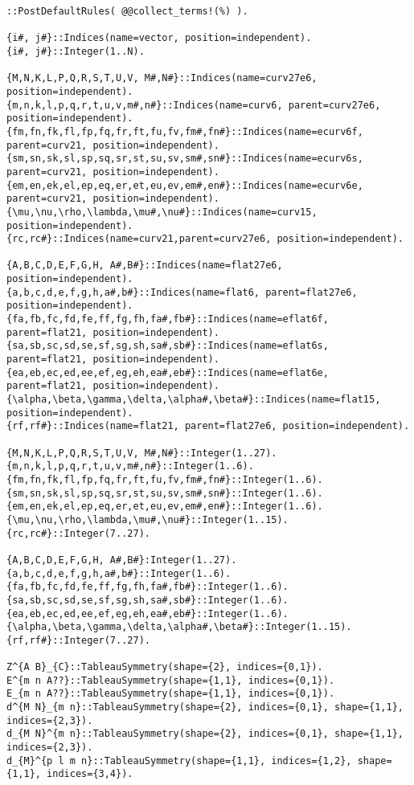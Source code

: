 \documentclass[11pt]{article}
\begin{document}
{\color[named]{Blue}\begin{verbatim}
::PostDefaultRules( @@collect_terms!(%) ).

{i#, j#}::Indices(name=vector, position=independent).
{i#, j#}::Integer(1..N).

{M,N,K,L,P,Q,R,S,T,U,V, M#,N#}::Indices(name=curv27e6, position=independent).
{m,n,k,l,p,q,r,t,u,v,m#,n#}::Indices(name=curv6, parent=curv27e6, position=independent).
{fm,fn,fk,fl,fp,fq,fr,ft,fu,fv,fm#,fn#}::Indices(name=ecurv6f, parent=curv21, position=independent).
{sm,sn,sk,sl,sp,sq,sr,st,su,sv,sm#,sn#}::Indices(name=ecurv6s, parent=curv21, position=independent).
{em,en,ek,el,ep,eq,er,et,eu,ev,em#,en#}::Indices(name=ecurv6e, parent=curv21, position=independent).
{\mu,\nu,\rho,\lambda,\mu#,\nu#}::Indices(name=curv15, position=independent).
{rc,rc#}::Indices(name=curv21,parent=curv27e6, position=independent).

{A,B,C,D,E,F,G,H, A#,B#}::Indices(name=flat27e6, position=independent).
{a,b,c,d,e,f,g,h,a#,b#}::Indices(name=flat6, parent=flat27e6, position=independent).
{fa,fb,fc,fd,fe,ff,fg,fh,fa#,fb#}::Indices(name=eflat6f, parent=flat21, position=independent).
{sa,sb,sc,sd,se,sf,sg,sh,sa#,sb#}::Indices(name=eflat6s, parent=flat21, position=independent).
{ea,eb,ec,ed,ee,ef,eg,eh,ea#,eb#}::Indices(name=eflat6e, parent=flat21, position=independent).
{\alpha,\beta,\gamma,\delta,\alpha#,\beta#}::Indices(name=flat15, position=independent).
{rf,rf#}::Indices(name=flat21, parent=flat27e6, position=independent).

{M,N,K,L,P,Q,R,S,T,U,V, M#,N#}::Integer(1..27).
{m,n,k,l,p,q,r,t,u,v,m#,n#}::Integer(1..6).
{fm,fn,fk,fl,fp,fq,fr,ft,fu,fv,fm#,fn#}::Integer(1..6).
{sm,sn,sk,sl,sp,sq,sr,st,su,sv,sm#,sn#}::Integer(1..6).
{em,en,ek,el,ep,eq,er,et,eu,ev,em#,en#}::Integer(1..6).
{\mu,\nu,\rho,\lambda,\mu#,\nu#}::Integer(1..15).
{rc,rc#}::Integer(7..27).

{A,B,C,D,E,F,G,H, A#,B#}:Integer(1..27).
{a,b,c,d,e,f,g,h,a#,b#}::Integer(1..6).
{fa,fb,fc,fd,fe,ff,fg,fh,fa#,fb#}::Integer(1..6).
{sa,sb,sc,sd,se,sf,sg,sh,sa#,sb#}::Integer(1..6).
{ea,eb,ec,ed,ee,ef,eg,eh,ea#,eb#}::Integer(1..6).
{\alpha,\beta,\gamma,\delta,\alpha#,\beta#}::Integer(1..15).
{rf,rf#}::Integer(7..27).

Z^{A B}_{C}::TableauSymmetry(shape={2}, indices={0,1}).
E^{m n A??}::TableauSymmetry(shape={1,1}, indices={0,1}).
E_{m n A??}::TableauSymmetry(shape={1,1}, indices={0,1}).
d^{M N}_{m n}::TableauSymmetry(shape={2}, indices={0,1}, shape={1,1}, indices={2,3}).
d_{M N}^{m n}::TableauSymmetry(shape={2}, indices={0,1}, shape={1,1}, indices={2,3}).
d_{M}^{p l m n}::TableauSymmetry(shape={1,1}, indices={1,2}, shape={1,1}, indices={3,4}).


\end{verbatim}}
\end{document}
